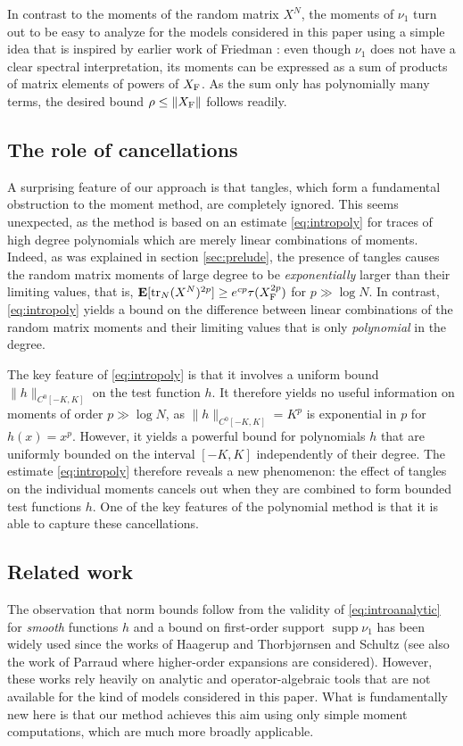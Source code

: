 \documentclass[10pt,reqno]{amsart}
\theoremstyle{definition}
\theoremstyle{remark}
\numberwithin{equation}{section}
\numberwithin{figure}{section}
\numberwithin{table}{section}
\newcommand{\supp}{\mathop{\mathrm{supp}}}
\newcommand{\ntrN}{\mathop{\mathrm{tr}_N}}
\begin{document}
In contrast to the moments of the random matrix $X^N$, the moments of 
$\nu_1$ turn out to be easy to analyze for the models 
considered in this paper using a simple idea that is inspired by 
earlier work of Friedman \cite[Lemma~2.4]{Fri03}: even though $\nu_1$ does 
not have a clear spectral interpretation, its moments can be expressed as 
a sum of products of matrix elements of powers of $X_{\rm F}$. As the sum 
only has polynomially many terms, the desired bound $\rho\le\|X_{\rm F}\|$ 
follows readily.


\subsection{The role of cancellations}

A surprising feature of our approach is that tangles, which form a 
fundamental obstruction to the moment method, are completely ignored. This 
seems unexpected, as the method is based on an estimate 
\eqref{eq:intropoly} for traces of high degree polynomials which are 
merely linear combinations of moments. Indeed, as was explained in section 
\ref{sec:prelude}, the presence of tangles causes the random matrix 
moments of large degree to be \emph{exponentially} larger than their 
limiting values, that is, $\mathbf{E}[\ntrN (X^N)^{2p}] \ge 
e^{cp}\tau(X_{\rm F}^{2p})$ for $p\gg\log N$. In contrast, 
\eqref{eq:intropoly} yields a bound on the difference between linear 
combinations of the random matrix moments and their limiting values that 
is only \emph{polynomial} in the degree.

The key feature of \eqref{eq:intropoly} is that it involves a uniform 
bound $\|h\|_{C^0[-K,K]}$ on the test function $h$. It therefore yields no 
useful information on moments of order $p\gg\log N$, as 
$\|h\|_{C^0[-K,K]}=K^p$ is exponential in $p$ for $h(x)=x^p$. However, it 
yields a powerful bound for polynomials $h$ that are uniformly bounded on 
the interval $[-K,K]$ independently of their degree. The estimate 
\eqref{eq:intropoly} therefore reveals a new phenomenon: the effect of 
tangles on the individual moments cancels out when they are combined to 
form bounded test functions $h$. One of the key features of the polynomial 
method is that it is able to capture these cancellations.


\subsection{Related work}

The observation that norm bounds follow from the validity of 
\eqref{eq:introanalytic} for \emph{smooth} functions $h$ and a bound on 
first-order support $\supp\nu_1$ has been widely used since the works of 
Haagerup and Thorbj{\o}rnsen \cite{HT05} and Schultz \cite{Sch05} (see 
also the work of Parraud \cite{Par23} where higher-order expansions are 
considered). However, these works rely heavily on analytic and 
operator-algebraic tools that are not available for the kind of models 
considered in this paper. What is fundamentally new here is that our 
method achieves this aim using only simple moment computations, which are 
much more broadly applicable.
\end{document}
